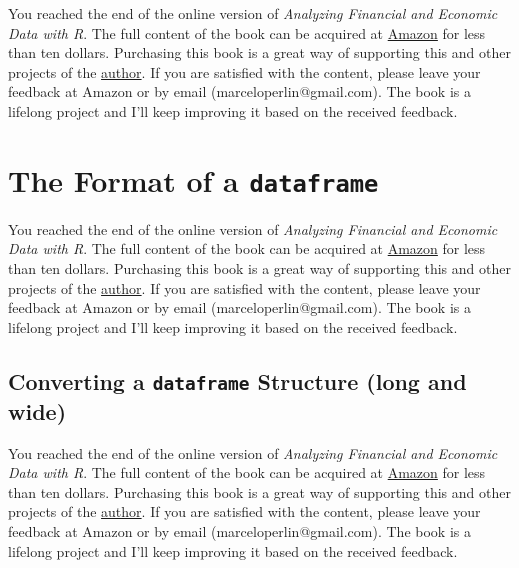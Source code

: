 \documentclass[
  12pt,
]{book}
\newenvironment{pleasebuyit}
{\begin{noteblock}
		
	} {\end{noteblock}}
\begin{document}
\begin{pleasebuyit}
You reached the end of the online version of \emph{Analyzing Financial
and Economic Data with R}. The full content of the book can be acquired
at \href{https://www.amazon.com/dp/B084LSNXMN}{Amazon} for less than ten
dollars. Purchasing this book is a great way of supporting this and
other projects of the \href{https://www.msperlin.com/}{author}. If you
are satisfied with the content, please leave your feedback at Amazon or
by email (marceloperlin@gmail.com). The book is a lifelong project and
I'll keep improving it based on the received feedback.
\end{pleasebuyit}

\hypertarget{the-format-of-a-dataframe}{%
\section{\texorpdfstring{The Format of a \texttt{dataframe}}{The Format of a dataframe}}\label{the-format-of-a-dataframe}}

\begin{pleasebuyit}
You reached the end of the online version of \emph{Analyzing Financial
and Economic Data with R}. The full content of the book can be acquired
at \href{https://www.amazon.com/dp/B084LSNXMN}{Amazon} for less than ten
dollars. Purchasing this book is a great way of supporting this and
other projects of the \href{https://www.msperlin.com/}{author}. If you
are satisfied with the content, please leave your feedback at Amazon or
by email (marceloperlin@gmail.com). The book is a lifelong project and
I'll keep improving it based on the received feedback.
\end{pleasebuyit}

\hypertarget{converting-a-dataframe-structure-long-and-wide}{%
\subsection{\texorpdfstring{Converting a \texttt{dataframe} Structure (long and wide)}{Converting a dataframe Structure (long and wide)}}\label{converting-a-dataframe-structure-long-and-wide}}

\begin{pleasebuyit}
You reached the end of the online version of \emph{Analyzing Financial
and Economic Data with R}. The full content of the book can be acquired
at \href{https://www.amazon.com/dp/B084LSNXMN}{Amazon} for less than ten
dollars. Purchasing this book is a great way of supporting this and
other projects of the \href{https://www.msperlin.com/}{author}. If you
are satisfied with the content, please leave your feedback at Amazon or
by email (marceloperlin@gmail.com). The book is a lifelong project and
I'll keep improving it based on the received feedback.
\end{pleasebuyit}
\end{document}
